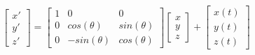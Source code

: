 \documentclass[twoside]{article}
\begin{document}
\maketitle
\thispagestyle{style2}

\vspace{0.005cm}
\[
\begin{bmatrix}
  x' \\
  y' \\
  z'

\end{bmatrix}
= 
\begin{bmatrix}
  1 & 0 & 0 \\
  0 & cos(\theta) & sin(\theta) \\
  0 & -sin(\theta) & cos(\theta)
\end{bmatrix}
\begin{bmatrix}
  x \\
  y \\
  z

\end{bmatrix}
+
\begin{bmatrix}
  x(t) \\
  y(t) \\
  z(t)

\end{bmatrix}
\]

\newpage
\end{document}
